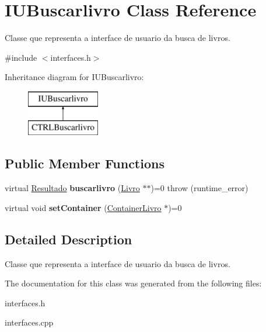 \hypertarget{classIUBuscarlivro}{}\section{I\+U\+Buscarlivro Class Reference}
\label{classIUBuscarlivro}


Classe que representa a interface de usuario da busca de livros.  




{\ttfamily \#include $<$interfaces.\+h$>$}

Inheritance diagram for I\+U\+Buscarlivro\+:\begin{figure}[H]
\begin{center}
\leavevmode
\includegraphics[height=2.000000cm]{classIUBuscarlivro}
\end{center}
\end{figure}
\subsection*{Public Member Functions}
\begin{DoxyCompactItemize}
\item 
\mbox{\label{classIUBuscarlivro_a515873754584a3ea658542a1df824300}} 
virtual \hyperlink{classResultado}{Resultado} {\bfseries buscarlivro} (\hyperlink{classLivro}{Livro} $\ast$$\ast$)=0  throw (runtime\+\_\+error)
\item 
\mbox{\label{classIUBuscarlivro_ac592aadc8434a710ec98b5a5ed753883}} 
virtual void {\bfseries set\+Container} (\hyperlink{classContainerLivro}{Container\+Livro} $\ast$)=0
\end{DoxyCompactItemize}


\subsection{Detailed Description}
Classe que representa a interface de usuario da busca de livros. 

The documentation for this class was generated from the following files\+:\begin{DoxyCompactItemize}
\item 
interfaces.\+h\item 
interfaces.\+cpp\end{DoxyCompactItemize}
